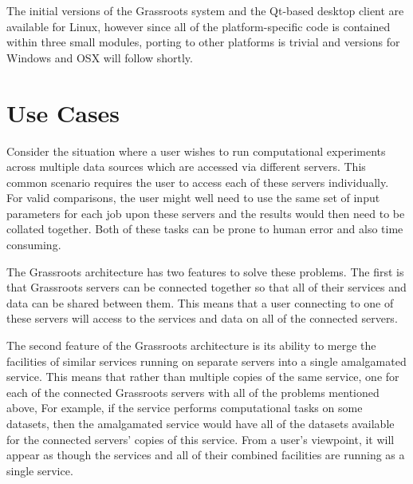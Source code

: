 \documentclass[9pt,a4paper]{extarticle}
\begin{document}
The initial versions of the Grassroots system and the Qt-based desktop client are available for Linux, however since all of the platform-specific code is contained within three small modules, porting to other platforms is trivial and versions for Windows and OSX will follow shortly.




\section*{Use Cases} \label{sec:usage} %

Consider the situation where a user wishes to run computational experiments across multiple data sources which are accessed via different servers. 
This common scenario requires the user to access each of these servers individually. For valid comparisons, the user might well need to use the same set of input parameters for each job upon these servers and the results would then need to be collated together. Both of these tasks can be prone to human error and also time consuming. 

The Grassroots architecture has two features to solve these problems. The first is that Grassroots servers can be connected together so that all of their services and data can be shared between them. This means that a user connecting to one of these servers will access to the services and data on all of the connected servers.

The second feature of the Grassroots architecture is its ability to merge the facilities of similar services running on separate servers into a single amalgamated service. This means that rather than multiple copies of the same service, one for each of the connected Grassroots servers with all of the problems mentioned above, 
For example, if the service performs computational tasks on some datasets, then the amalgamated service would have all of the datasets available for the connected servers' copies of this service. From a user’s viewpoint, it will appear as though the services and all of their combined facilities are running as a single service. 
\end{document}
